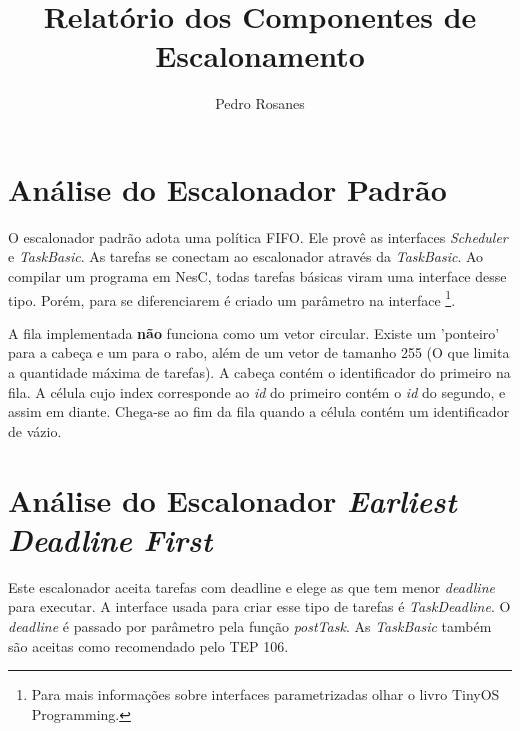 \documentclass[a4paper,onecolumn, 10pt]{article}
\title{Relatório dos Componentes de Escalonamento}
\author{Pedro Rosanes}
\begin{document}
\maketitle





\section{Análise do Escalonador Padrão}\label{escalonadorpadrao}

O escalonador padrão adota uma política FIFO. Ele provê as interfaces \textit{Scheduler} e \textit{TaskBasic}.
As tarefas se conectam ao escalonador através da \textit{TaskBasic}. Ao compilar um programa em NesC, todas tarefas
básicas viram uma interface desse tipo. Porém, para se diferenciarem é criado um parâmetro na interface
\footnote{Para mais informações sobre interfaces parametrizadas olhar o livro TinyOS Programming\cite[s. 8.3 e 9]{tinyosprogramming}.}.

A fila implementada \textbf{não} funciona como um vetor circular. Existe um 'ponteiro' para a cabeça e um para o rabo,
além de um vetor de tamanho 255 (O que limita a quantidade máxima de tarefas). A cabeça contém o identificador do 
primeiro na fila. A célula cujo index corresponde ao \textit{id} do primeiro contém o \textit{id} do segundo, e assim em 
diante. Chega-se ao fim da fila quando a célula contém um identificador de vázio.


\section{Análise do Escalonador \textit{Earliest Deadline First}}\label{escalonadoredf}

Este escalonador aceita tarefas com deadline e elege as que tem menor \textit{deadline} para executar. A interface usada para criar
esse tipo de tarefas é \textit{TaskDeadline}. O \textit{deadline} é passado por parâmetro pela função \textit{postTask}.
As \textit{TaskBasic} também são aceitas como recomendado pelo TEP
106\cite{tep106}.
\end{document}
